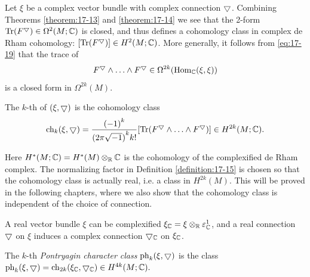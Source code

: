 Let $\xi$ be a complex vector bundle with complex connection $\bigtriangledown$. Combining Theorems \ref{theorem:17-13} 
and \ref{theorem:17-14} we see that the 2-form $\mathrm{Tr}( {F}^\bigtriangledown)\in\Omega^{2}( {M;{\mathbb{C}}})$ is closed, and thus 
defines a cohomology class in complex de Rham cohomology: $[  {\mathrm{Tr}( {F}^\bigtriangledown) }]   \in  {H}^{2}( {M;{\mathbb{C}}})$. 
More generally, it follows from \eqref{eq:17-19} that the trace of
\[
  {F}^\bigtriangledown \land  \ldots  \land  {F}^\bigtriangledown \in  \Omega^{2k}( {{\operatorname{Hom}}_{{\mathbb{C}}}( \xi, \xi) })
\]
is a closed form in $\Omega^{2k}(M)$.

\begin{definition}\label{definition:17-15}
The $k$-th  of $( {\xi, \bigtriangledown  })$ is the cohomology class
\[
  {\mathrm{ch}}_{k}( {\xi,\bigtriangledown })  
  = \frac{{(-1) }^{k}}{{( 2\pi \sqrt{-1}) }^{k}k!}[  {\mathrm{Tr}( {{F}^\bigtriangledown \land  \ldots  \land  {F}^\bigtriangledown}) }]  
  \in  {H}^{2k}( {M;{\mathbb{C}}}).
\]
\end{definition}

Here ${H}^{ * }( {M;{\mathbb{C}}})  = {H}^{ * }(M) \otimes_{\mathbb{R}}{\mathbb{C}}$ is the cohomology of the complexified de Rham complex. 
The normalizing factor in Definition \ref{definition:17-15} is chosen so that the cohomology class is actually real, i.e. a 
class in ${H}^{2k}(M)$. This will be proved in the following chapters, where we also show that the cohomology 
class is independent of the choice of connection.

A real vector bundle $\xi$ can be complexified ${\xi }_{{\mathbb{C}}} = \xi \otimes_{\mathbb{R}}{\varepsilon }_{{\mathbb{C}}}^1$, and a 
real connection $\bigtriangledown$ on $\xi$ induces a complex connection $\bigtriangledown_{{\mathbb{C}}}$ on ${\xi }_{{\mathbb{C}}}$.

\begin{definition}\label{definition:17-16}
  The $k$-th \textit{Pontryagin character class} $\mathrm{ph}_k(\xi, \bigtriangledown)$ is the 
  class $\mathrm{ph}_k(\xi, \bigtriangledown) = \mathrm{ch}_{2k}(\xi_{\mathbb{C}},\bigtriangledown_{\mathbb{C}}) \in {H}^{4k}(M;{\mathbb{C}}).$
\end{definition}

